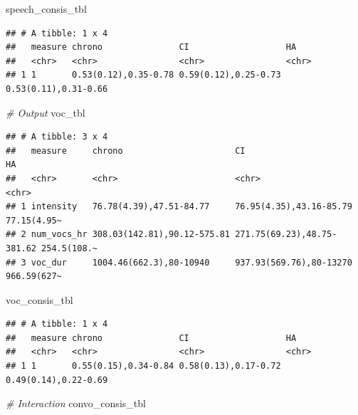 \documentclass[
]{article}
\newenvironment{Shaded}{\begin{snugshade}}{\end{snugshade}}
\newcommand{\CommentTok}[1]{\textcolor[rgb]{0.56,0.35,0.01}{\textit{#1}}}
\newcommand{\NormalTok}[1]{#1}
\begin{document}
\begin{Shaded}
\begin{Highlighting}[]
\NormalTok{speech\_consis\_tbl}
\end{Highlighting}
\end{Shaded}

\begin{verbatim}
## # A tibble: 1 x 4
##   measure chrono               CI                   HA                  
##   <chr>   <chr>                <chr>                <chr>               
## 1 1       0.53(0.12),0.35-0.78 0.59(0.12),0.25-0.73 0.53(0.11),0.31-0.66
\end{verbatim}

\begin{Shaded}
\begin{Highlighting}[]
\CommentTok{\# Output}
\NormalTok{voc\_tbl}
\end{Highlighting}
\end{Shaded}

\begin{verbatim}
## # A tibble: 3 x 4
##   measure     chrono                      CI                         HA         
##   <chr>       <chr>                       <chr>                      <chr>      
## 1 intensity   76.78(4.39),47.51-84.77     76.95(4.35),43.16-85.79    77.15(4.95~
## 2 num_vocs_hr 308.03(142.81),90.12-575.81 271.75(69.23),48.75-381.62 254.5(108.~
## 3 voc_dur     1004.46(662.3),80-10940     937.93(569.76),80-13270    966.59(627~
\end{verbatim}

\begin{Shaded}
\begin{Highlighting}[]
\NormalTok{voc\_consis\_tbl}
\end{Highlighting}
\end{Shaded}

\begin{verbatim}
## # A tibble: 1 x 4
##   measure chrono               CI                   HA                  
##   <chr>   <chr>                <chr>                <chr>               
## 1 1       0.55(0.15),0.34-0.84 0.58(0.13),0.17-0.72 0.49(0.14),0.22-0.69
\end{verbatim}

\begin{Shaded}
\begin{Highlighting}[]
\CommentTok{\# Interaction}
\NormalTok{convo\_consis\_tbl}
\end{Highlighting}
\end{Shaded}
\end{document}
